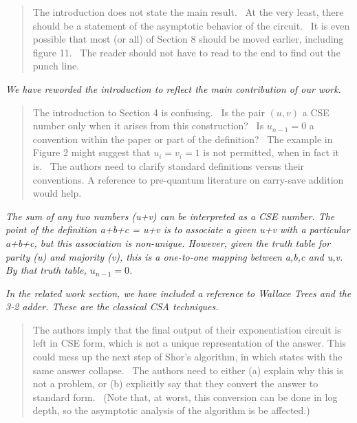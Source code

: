 \documentclass{article}
\theoremstyle{plain} \newtheorem{lemma}{Lemma}
\begin{document}

\begin{quote}
The introduction does not state the main result.  At the very
least, there should be a statement of the asymptotic behavior of
the circuit.  It is even possible that most (or all) of Section 8
should be moved earlier, including figure 11.  The reader should not
have to read to the end to find out the punch line.
\end{quote}

{\it We have reworded the introduction to reflect the main contribution of our work.}


\begin{quote}
The introduction to Section 4 is confusing.  Is the pair $(u,v)$ a
CSE number only when it arises from this construction?  Is $u_{n-1} = 0 $
a convention within the paper or part of the definition?  The example
in Figure 2 might suggest that $u_i = v_i = 1$ is not permitted, when
in fact it is.  The authors need to clarify standard definitions versus
their conventions. A reference to pre-quantum literature on carry-save
addition would help.
\end{quote}

{\it  The sum of any two numbers (u+v) can be interpreted as a CSE number.
The point of the definition a+b+c = u+v is to associate a given u+v with a particular a+b+c,
but this association is non-unique. However, given the truth table for parity (u) and majority (v),
this is a one-to-one mapping between a,b,c and u,v. By that truth table, $u_{n-1} = 0$. }

{\it In the related work section, we have included a reference to Wallace Trees and the 3-2 adder.  These are the classical CSA techniques.}


\begin{quote}
The authors imply that the final output of their exponentiation circuit
is left in CSE form, which is not a unique representation of the answer.
This could mess up the next step of Shor's algorithm, in which states with
the same answer collapse.  The authors need to either (a) explain why this
is not a problem, or (b) explicitly say that they convert the answer to
standard form.  (Note that, at worst, this conversion can be done in log
depth, so the asymptotic analysis of the algorithm is be affected.)
\end{quote}
\end{document}
